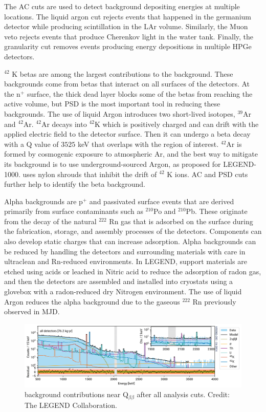 The AC cuts are used to detect background depositing energies at multiple locations. The liquid argon cut rejects events that happened in the germanium detector while producing scintillation in the LAr volume. Similarly, the Muon veto rejects events that produce Cherenkov light in the water tank. Finally, the granularity cut removes events producing energy depositions in multiple HPGe detectors.

$^{42}$ K betas are among the largest contributions to the background. These backgrounds come from betas that interact on all surfaces of the detectors. At the n$^+$ surface, the thick dead layer blocks some of the betas from reaching the active volume, but PSD is the most important tool in reducing these backgrounds. The use of liquid Argon introduces two short-lived isotopes, $^{39}$Ar and $^{42}$Ar.  $^{42}$Ar decays into $^{42}$K which is positively charged and can drift with the applied electric field to the detector surface. Then it can undergo a beta decay with a Q value of $3525$ keV that overlaps with the region of interest. $^{42}$Ar is formed by cosmogenic exposure to atmospheric Ar, and the best way to mitigate its background is to use underground-sourced Argon, as proposed for LEGEND-1000. {\Ltwo} uses nylon shrouds that inhibit the drift of $^{42}$ K ions. AC and PSD cuts further help to identify the beta background.

Alpha backgrounds are p$^+$ and passivated surface events that are derived primarily from surface contaminants such as $^{210}$Po and $^{210}$Pb. These originate from the decay of the natural $^{222}$ Rn gas that is adsorbed on the surface during the fabrication, storage, and assembly processes of the detectors. Components can also develop static charges that can increase adsorption. Alpha backgrounds can be reduced by handling the detectors and surrounding materials with care in ultraclean and Rn-reduced environments. In LEGEND, support materials are etched using acids or leached in Nitric acid to reduce the adsorption of radon gas, and then the detectors are assembled and installed into cryostats using a glovebox with a radon-reduced dry Nitrogen environment. The use of liquid Argon reduces the alpha background due to the gaseous $^{222}$ Rn previously observed in MJD. 

\begin{figure}
\centering
  \includegraphics[width=0.99\linewidth]{ch2/figs/l200_bkgmodel.png}
  \caption{{\Ltwo} background contributions near Q$_{\beta\beta}$ after all analysis cuts. Credit: The LEGEND Collaboration.}
\label{ch2:fig:L200_background_model_fit}
  \end{figure}

